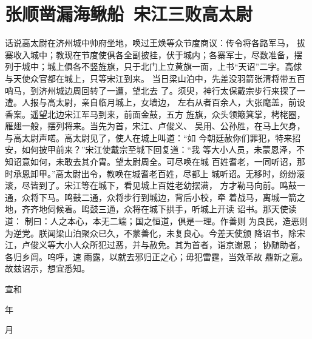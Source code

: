 \chapter{张顺凿漏海鳅船~宋江三败高太尉}

话说高太尉在济州城中帅府坐地，唤过王焕等众节度商议：传令将各路军马，
拔寨收入城中；教现在节度使俱各全副披挂，伏于城内；各寨军士，尽数准备，摆
列于城中；城上俱各不竖旌旗，只于北门上立黄旗一面，上书“天诏”二字。高俅
与天使众官都在城上，只等宋江到来。
当日梁山泊中，先差没羽箭张清将带五百哨马，到济州城边周回转了一遭，望北去
了。须臾，神行太保戴宗步行来探了一遭。人报与高太尉，亲自临月城上，女墙边，
左右从者百余人，大张麾盖，前设香案。遥望北边宋江军马到来，前面金鼓，五方
旌旗，众头领簸箕掌，栲栳圈，雁翅一般，摆列将来。当先为首，宋江、卢俊义、
吴用、公孙胜，在马上欠身，与高太尉声喏。高太尉见了，使人在城上叫道：“如
今朝廷赦你们罪犯，特来招安，如何披甲前来？”宋江使戴宗至城下回复道：“我
等大小人员，未蒙恩泽，不知诏意如何，未敢去其介胄。望太尉周全。可尽唤在城
百姓耆老，一同听诏，那时承恩卸甲。”高太尉出令，教唤在城耆老百姓，尽都上
城听诏。无移时，纷纷滚滚，尽皆到了。宋江等在城下，看见城上百姓老幼摆满，
方才勒马向前。鸣鼓一通，众将下马。鸣鼓二通，众将步行到城边，背后小校，牵
着战马，离城一箭之地，齐齐地伺候着。鸣鼓三通，众将在城下拱手，听城上开读
诏书。那天使读道：
制曰：人之本心，本无二端；国之恒道，俱是一理。作善则
为良民，造恶则为逆党。朕闻梁山泊聚众已久，不蒙善化，未复良心。今差天使颁
降诏书，除宋江，卢俊义等大小人众所犯过恶，并与赦免。其为首者，诣京谢恩；
协随助者，各归乡闾。呜呼，速雨露，以就去邪归正之心；毋犯雷霆，当效革故
鼎新之意。故兹诏示，想宜悉知。

宣和

年

月

